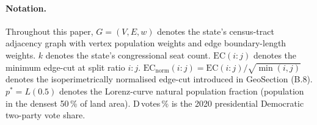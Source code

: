 \paragraph{Notation.}
Throughout this paper, $G = (V, E, w)$ denotes the state's census-tract
adjacency graph with vertex population weights and edge boundary-length weights.
$k$ denotes the state's congressional seat count.
$\mathrm{EC}(i:j)$ denotes the minimum edge-cut at split ratio $i:j$.
$\mathrm{EC}_\text{norm}(i:j) = \mathrm{EC}(i:j) / \sqrt{\min(i,j)}$ denotes
the isoperimetrically normalised edge-cut introduced in GeoSection (B.8).
$p^* = L(0.5)$ denotes the Lorenz-curve natural population fraction
(population in the densest 50\,\% of land area).
D\,votes\,\% is the 2020 presidential Democratic two-party vote share.


